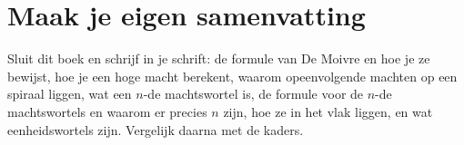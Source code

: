 
\begin{oefeningen}






\end{oefeningen}


\ifzelfstudie
\section*{Maak je eigen samenvatting}
Sluit dit boek en schrijf in je schrift: de formule van De Moivre en hoe je ze bewijst, hoe je een hoge macht berekent, waarom opeenvolgende machten op een spiraal liggen, wat een $n$-de machtswortel is, de formule voor de $n$-de machtswortels en waarom er precies $n$ zijn, hoe ze in het vlak liggen, en wat eenheidswortels zijn. Vergelijk daarna met de kaders.
\fi
